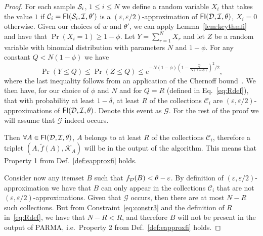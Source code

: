 \begin{proof}
  For each sample ${\cal S}_i$, $1\le i\le N$ we define a random variable $X_i$ that
  takes the value $1$ if $\mathcal{C}_i=\mathsf{FI}({\cal S}_i,{\cal I},\theta')$ is a
  $(\varepsilon,\varepsilon/2)$-approximation of $\mathsf{FI}({\cal D},{\cal I},\theta)$, $X_i=0$
  otherwise. Given our choices of $w$ and $\theta'$, we can apply
  Lemma~\ref{lem:keythmfi} and have that $\Pr(X_i=1)\ge 1-\phi$. Let
  $Y=\sum_{r=1}^N X_r$ and let $Z$ be a random variable with binomial
  distribution with parameters $N$ and $1-\phi$. For any constant $Q<N(1-\phi)$ we have
  \[
  \Pr(Y\le Q)\le\Pr(Z\le Q)\le e^{-N(1-\phi)(1-\frac{Q}{N(1-\phi)})^2/2},
  \]
  where the last inequality follows from an application of the Chernoff
  bound~\cite[Chap.~4]{MitzenmacherU05}.
  We then have, for our choice of $\phi$ and $N$ and for $Q=R$
  (defined in Eq.~\eqref{eq:Rdef}), that with probability at least $1-\delta$,
  at least $R$ of the collections $\mathcal{C}_i$ are
  $(\varepsilon,\varepsilon/2)$-approximations of $\mathsf{FI}({\cal D},{\cal I},\theta)$. Denote
  this event as $\mathcal{G}$. For the rest of the proof we will assume that
  $\mathcal{G}$ indeed occurs.

  Then $\forall A\in\mathsf{FI}({\cal D},{\cal I},\theta)$, $A$ belongs to at least $R$ of the
  collections $\mathcal{C}_i$, therefore a triplet
  $(A,\tilde{f}(A),\mathcal{K}_A)$ will be in the output of the algorithm. This
  means that Property 1 from Def.~\ref{def:eapproxfi} holds. 

  Consider now any itemset $B$ such that $f_{\cal D}(B)<\theta-\varepsilon$. By
  definition of $(\varepsilon,\varepsilon/2)$-approximation we have that $B$ can
  only appear in the collections $\mathcal{C}_i$ that are not
  $(\varepsilon,\varepsilon/2)$-approximations. Given
  that $\mathcal{G}$ occurs, then there are at most  $N-R$ such collections. But
  from Constraint~\eqref{eq:constr3} and the definition of $R$
  in~\eqref{eq:Rdef}, we have that $N-R< R$, and therefore $B$ will not be
  present in the output of PARMA, i.e.~Property 2 from Def.~\ref{def:eapproxfi} holds.


\end{proof}
